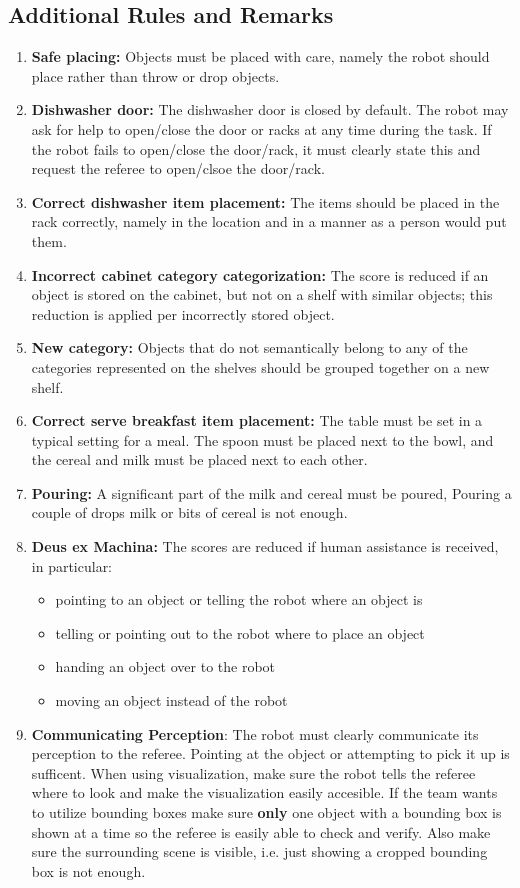 \subsection*{Additional Rules and Remarks}
\begin{enumerate}[nosep]
	\item \textbf{Safe placing:} Objects must be placed with care, namely the robot should place rather than throw or drop objects.
	\item \textbf{Dishwasher door:} The dishwasher door is closed by default.
	The robot may ask for help to open/close the door or racks at any time during the task. If the robot fails to open/close the door/rack, it must clearly state this and request the referee to open/clsoe the door/rack.
	\item \textbf{Correct dishwasher item placement:} The items should be placed in the rack correctly, namely in the location and in a manner as a person would put them.
	\item \textbf{Incorrect cabinet category categorization:} The score is reduced if an object is stored on the cabinet, but not on a shelf with similar objects; this reduction is applied per incorrectly stored object.
	\item \textbf{New category:} Objects that do not semantically belong to any of the categories represented on the shelves should be grouped together on a new shelf.
	\item \textbf{Correct serve breakfast item placement:} The table must be set in a typical setting for a meal. The spoon must be placed next to the bowl, and the cereal and milk must be placed next to each other.
	\item \textbf{Pouring:} A significant part of the milk and cereal must be poured, Pouring a couple of drops milk or bits of cereal is not enough.
	\item \textbf{Deus ex Machina:} The scores are reduced if human assistance is received, in particular:
	\begin{itemize}[nosep]
		\item pointing to an object or telling the robot where an object is
		\item telling or pointing out to the robot where to place an object
		\item handing an object over to the robot
		\item moving an object instead of the robot
	\end{itemize}
	\item \textbf{Communicating Perception}: The robot must clearly communicate its perception to the referee.
	Pointing at the object or attempting to pick it up is sufficent. When using visualization, make sure the robot 
	tells the referee where to look and make the visualization easily accesible. 
	If the team wants to utilize bounding boxes make sure \textbf{only} one object with a bounding box is shown 
	at a time so the referee is easily able to check and verify. Also make sure the surrounding scene is visible, i.e.
	just showing a cropped bounding box is not enough.
\end{enumerate}

